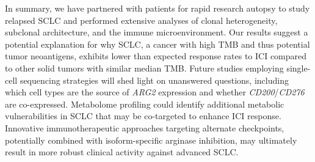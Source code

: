 In summary, we have partnered with patients for rapid research autopsy to study relapsed SCLC and performed extensive analyses of clonal heterogeneity, subclonal architecture, and the immune microenvironment. Our results suggest a potential explanation for why SCLC, a cancer with high TMB and thus potential tumor neoantigens, exhibits lower than expected response rates to ICI compared to other solid tumors with similar median TMB\@. Future studies employing single-cell sequencing strategies will shed light on unanswered questions, including which cell types are the source of \textit{ARG2} expression and whether \textit{CD200}/\textit{CD276} are co-expressed. Metabolome profiling could identify additional metabolic vulnerabilities in SCLC that may be co-targeted to enhance ICI response. Innovative immunotherapeutic approaches targeting alternate checkpoints, potentially combined with isoform-specific arginase inhibition, may ultimately result in more robust clinical activity against advanced SCLC\@.

